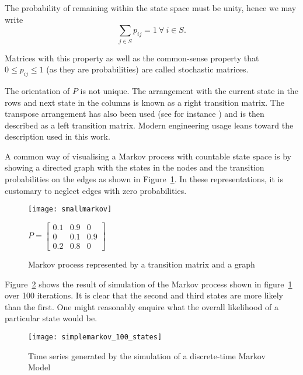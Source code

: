 The probability of remaining within the state space must be unity, hence we may write 
\begin{equation}
  \label{eq:rowsumone}
  \sum_{j\in S} p_{ij}=1~\forall~i \in S.
\end{equation}

Matrices with this property as well as the common-sense property that $0 \leq p_{ij} \leq 1$ (as they are probabilities) are called stochastic matrices.

The orientation of $P$ is not unique. 
The arrangement with the current state in the rows and next state in the columns is known as a right transition matrix. 
The transpose arrangement has also been used (see for instance \citet{bhar.hamori2004hidden}) and is then described as a left transition matrix. 
Modern engineering usage leans toward the description used in this work.

A common way of visualising a Markov process with countable state space is by showing a directed graph with the states in the nodes and the transition probabilities on the edges as shown in Figure~\ref{fig:markovgraph}.
In these representations, it is customary to neglect edges with zero probabilities.

\begin{figure}[htbp]
  \centering
  \begin{minipage}{0.4\textwidth}
    \texttt{[image: smallmarkov]}
  \end{minipage}
  \begin{minipage}{0.4\textwidth}
   $\displaystyle P = \left [ 
      \begin{array}{ccc} 
        0.1 & 0.9 & 0 \\ 
        0 & 0.1 & 0.9 \\ 
        0.2 & 0.8 & 0 
      \end{array} \right ]$
  \end{minipage}
  \caption{Markov process represented by a transition matrix and a graph}
  \label{fig:markovgraph}
\end{figure}

Figure~\ref{fig:markovtimeseries} shows the result of simulation of the Markov process shown in figure~\ref{fig:markovgraph} over 100 iterations.  
It is clear that the second and third states are more likely than the first.
One might reasonably enquire what the overall likelihood of a particular state would be. 

\begin{figure}[htbp]
  \centering
  \texttt{[image: simplemarkov\_100\_states]}
  \caption{Time series generated by the simulation of a discrete-time Markov Model}
  \label{fig:markovtimeseries}
\end{figure}


